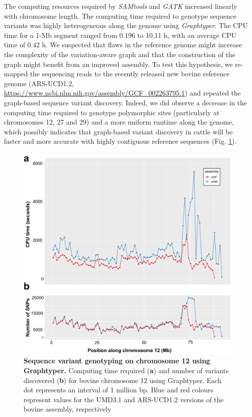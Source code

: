 \documentclass[../main.tex]{subfiles}
\begin{document}
The computing resources required by \emph{SAMtools} and \emph{GATK} increased linearly with chromosome length. 
The computing time required to genotype sequence variants was highly heterogeneous along the genome using \emph{Graphtyper}. 
The CPU time for a 1-Mb segment ranged from 0.196 to 10.11 h, with an average CPU time of 0.42 h. 
We suspected that flaws in the reference genome might increase the complexity of the variation-aware graph and that the construction of the graph might benefit from an improved assembly. 
To test this hypothesis, we re-mapped the sequencing reads to the recently released new bovine reference genome (ARS-UCD1.2, \url{https://www.ncbi.nlm.nih.gov/assembly/GCF_002263795.1}) and repeated the graph-based sequence variant discovery. 
Indeed, we did observe a decrease in the computing time required to genotype polymorphic sites (particularly at chromosomes 12, 27 and 29) and a more uniform runtime along the genome, which possibly indicates that graph-based variant discovery in cattle will be faster and more accurate with highly contiguous reference sequences (Fig. \ref{fig:varassemb}).


\begin{figure}[!htb]
    \centering
    \includegraphics[width=\textwidth]{paper1/main_figure/Figure5.pdf}
    \caption{\textbf{Sequence variant genotyping on chromosome 12 using Graphtyper.} Computing time required (\textbf{a}) and number of variants discovered (\textbf{b}) for bovine chromosome 12 using Graphtyper. 
    Each dot represents an interval of 1 million bp. Blue and red colours represent values for the UMD3.1 and ARS-UCD1.2 versions of the bovine assembly, respectively}
    \label{fig:varassemb}
\end{figure}
\end{document}
